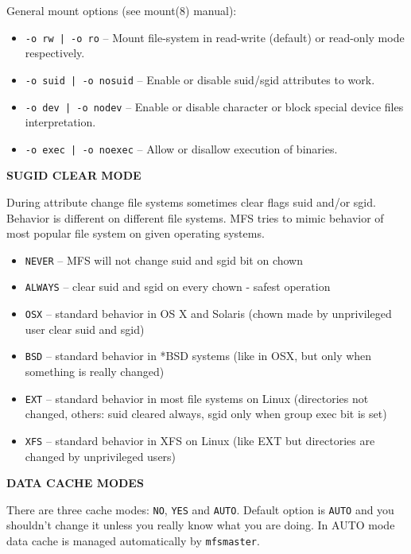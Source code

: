 \documentclass[a4paper,11pt,english]{report}
\def\code#1{\texttt{#1}}
\begin{document}
				\bigskip
				General mount options (see mount(8) manual):
				\begin{itemize}
					\item \code{-o rw | -o ro}
						-- Mount  file-system  in  read-write  (default)  or read-only mode respectively.

					\item \code{-o suid | -o nosuid}
						-- Enable or disable suid/sgid attributes to work.

					\item \code{-o dev | -o nodev}
						-- Enable or disable character or block special device files interpretation.

					\item \code{-o exec | -o noexec}
						-- Allow or disallow execution of binaries.
				\end{itemize}
				\bigskip
				
				\textbf{SUGID CLEAR MODE}
				
				During attribute change file systems sometimes clear flags suid and/or sgid.  Behavior is different on different file systems.  MFS tries to mimic behavior of most popular file system on given operating systems.

					\begin{itemize}
						\item \code{NEVER}  -- MFS will not change suid and sgid bit on chown
						\item \code{ALWAYS} -- clear suid and sgid on every chown - safest operation
						\item \code{OSX}    -- standard behavior in OS X and Solaris (chown made by unprivileged user clear suid and sgid)
						\item \code{BSD}    -- standard behavior in *BSD systems (like in OSX, but only when something is really changed)
						\item \code{EXT}    -- standard behavior in most file systems on Linux (directories not changed, others: suid cleared always, sgid only when group exec bit is set)
						\item \code{XFS}    -- standard behavior in XFS on Linux (like EXT but directories are changed by unprivileged users)			
				\end{itemize}
				\bigskip
				
				\textbf{DATA CACHE MODES}
				
				There  are  three cache modes: \code{NO}, \code{YES} and \code{AUTO}. Default option is \code{AUTO} and you shouldn't change it unless you really know what you are doing. In AUTO mode data cache is managed automatically by \code{mfsmaster}.
\end{document}
